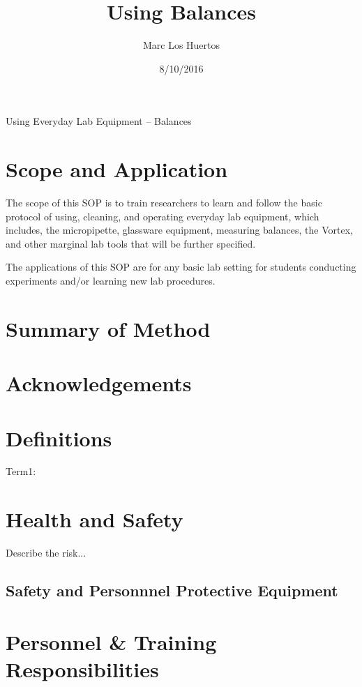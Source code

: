 \documentclass[12pt]{../SOP4_alpha}\usepackage[]{graphicx}\usepackage[]{xcolor}
\title{Using Balances}
\date{8/10/2016}
\author{Marc Los Huertos}
\begin{document}
\maketitle 
Using Everyday Lab Equipment -- Balances

\section{Scope and Application}

\NP The scope of this SOP is  to train researchers to learn and follow the basic protocol of using, cleaning, and operating everyday lab equipment, which includes, the micropipette, glassware equipment, measuring balances, the Vortex, and other marginal lab tools that will be further specified. 

\NP The applications of this SOP are for any basic lab setting for students conducting experiments and/or learning new lab procedures.

\section{Summary of Method}

\NP 

\tableofcontents

\newpage

\section{Acknowledgements}

\section{Definitions}

\NP Term1:


\section{Health and Safety}

\NP Describe the risk...


\subsection*{Safety and Personnnel Protective Equipment}


\section{Personnel \& Training Responsibilities}
\end{document}
